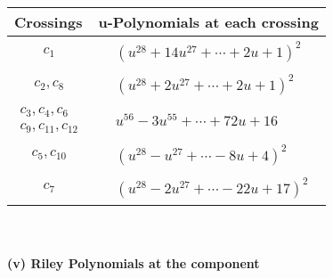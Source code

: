 \documentclass[1p]{elsarticle_modified}
\theoremstyle{definition}
\begin{document}
\begin{tabular}{m{50pt}|m{274pt}}
Crossings & \hspace{64pt}u-Polynomials at each crossing \\
\hline $$\begin{aligned}c_{1}\end{aligned}$$&$\begin{aligned}
&(u^{28}+14 u^{27}+\cdots+2 u+1)^{2}
\end{aligned}$\\
\hline $$\begin{aligned}c_{2},c_{8}\end{aligned}$$&$\begin{aligned}
&(u^{28}+2 u^{27}+\cdots+2 u+1)^{2}
\end{aligned}$\\
\hline $$\begin{aligned}c_{3},c_{4},c_{6}\\c_{9},c_{11},c_{12}\end{aligned}$$&$\begin{aligned}
&u^{56}-3 u^{55}+\cdots+72 u+16
\end{aligned}$\\
\hline $$\begin{aligned}c_{5},c_{10}\end{aligned}$$&$\begin{aligned}
&(u^{28}- u^{27}+\cdots-8 u+4)^{2}
\end{aligned}$\\
\hline $$\begin{aligned}c_{7}\end{aligned}$$&$\begin{aligned}
&(u^{28}-2 u^{27}+\cdots-22 u+17)^{2}
\end{aligned}$\\
\hline
\end{tabular}\\~\\
\newpage\renewcommand{\arraystretch}{1}
\flushleft \textbf{(v) Riley Polynomials at the component}\newline \\
\end{document}
